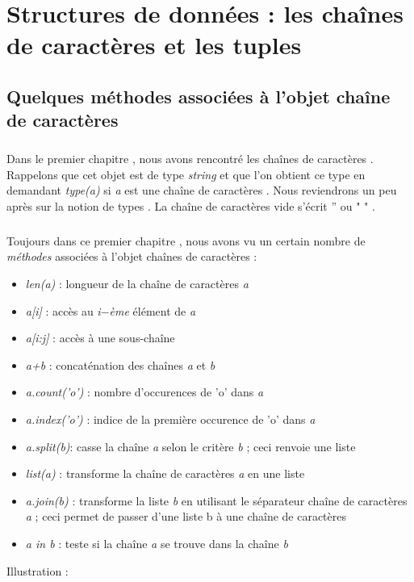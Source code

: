 \chapter{Structures de données : les chaînes de caractères et les tuples }
\section{Quelques méthodes associées à l'objet chaîne de caractères}
\paragraph{}
Dans le premier chapitre , nous avons rencontré les chaînes de caractères . Rappelons que cet objet est de type \textit{string} et que l'on obtient ce type en demandant \textit{type(a)} si \textit{a} est une chaîne de caractères . Nous reviendrons un peu après sur la notion de types . La chaîne de caractères vide s'écrit '' ou " " .\par
\paragraph{}
Toujours dans ce premier chapitre , nous avons vu un certain nombre de \textit{méthodes} associées à l'objet chaînes de caractères :\par 

\begin{itemize}
\item \textit{len(a)} : longueur de la chaîne de caractères \textit{a}
\item \textit{a[i]} : accès au \textit{i$-$ème} élément de \textit{a}
\item \textit{a[i:j]} : accès à une sous-chaîne 
\item \textit{a+b} : concaténation des chaînes \textit{a} et \textit{b}
\item \textit{a.count('o')} : nombre d'occurences de 'o' dans \textit{a}
\item \textit{a.index('o')} : indice de la première occurence de 'o' dans \textit{a}
\item \textit{a.split(b)}: casse la chaîne \textit{a} selon le critère \textit{b} ; ceci renvoie une liste
\item \textit{list(a)} : transforme la chaîne de caractères \textit{a} en une liste
\item \textit{a.join(b)} : transforme la liste \textit{b} en utilisant le séparateur chaîne de caractères \textit{a} ; ceci permet de passer d'une liste b à une chaîne de caractères
\item \textit{a in b} : teste si la chaîne \textit{a} se trouve dans la chaîne \textit{b}
\end{itemize}\par
\par 
Illustration :

